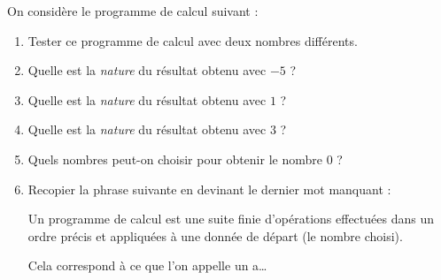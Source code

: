 \documentclass[10pt,openright,twoside,french]{book}
\begin{document}

On considère le programme de calcul suivant :\medskip

\medskip

\begin{enumerate}
    \item Tester ce programme de calcul avec deux nombres différents.
    \item Quelle est la \textit{nature} du résultat obtenu avec $-5$ ?
    \item Quelle est la \textit{nature} du résultat obtenu avec $1$ ?
    \item Quelle est la \textit{nature} du résultat obtenu avec $3$ ?
    \item Quels nombres peut-on choisir pour obtenir le nombre $0$ ?
    \item Recopier la phrase suivante en devinant le dernier mot manquant :
    \begin{center}
    \cursive
    Un programme de calcul est une suite finie d'opérations effectuées dans un ordre précis et appliquées à une donnée de départ (le nombre choisi).\par
    Cela correspond à ce que l'on appelle un a\ldots
    \end{center}
\end{enumerate}
\end{document}
